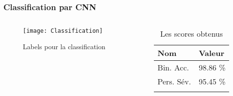 
\begin{frame}
    \frametitle{Classification par CNN}
    \begin{columns}
        \begin{column}{0.65\textwidth}
            \begin{figure}
            \texttt{[image: Classification]}       
            \caption{Labels pour la classification}
            \end{figure}
         \end{column}
         \pause
         \begin{column}{0.35\textwidth}
            \begin{table}[h!]
                \caption{Les scores obtenus}
                \centering
                \begin{tabular}{l l}
                \toprule
                \textbf{Nom} & \textbf{Valeur} \\
                \midrule
                Bin. Acc. & 98.86 \%\\
                Pers. Sév. & 95.45 \%\\
                \bottomrule\\
                \end{tabular}
            \end{table}
         \end{column}
    \end{columns}
\end{frame}

